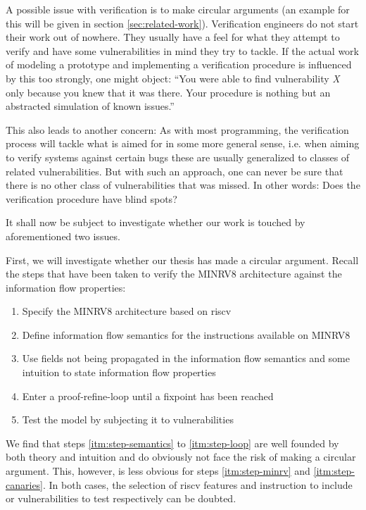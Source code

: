 A possible issue with verification is to make circular arguments (an example for this will be given in section \ref{sec:related-work}).
Verification engineers do not start their work out of nowhere.
They usually have a feel for what they attempt to verify and have some vulnerabilities in mind they try to tackle.
If the actual work of modeling a prototype and implementing a verification procedure is influenced by this too strongly, one might object:
\enquote{You were able to find vulnerability \textit{X} only because you knew that it was there. Your procedure is nothing but an abstracted simulation of known issues.}

This also leads to another concern:
As with most programming, the verification process will tackle what is aimed for in some more general sense, i.e. when aiming to verify systems against certain bugs these are usually generalized to classes of related vulnerabilities.
But with such an approach, one can never be sure that there is no other class of vulnerabilities that was missed.
In other words: Does the verification procedure have blind spots?

It shall now be subject to investigate whether our work is touched by aforementioned two issues.

First, we will investigate whether our thesis has made a circular argument.
Recall the steps that have been taken to verify the MINRV8 architecture against the information flow properties:
\begin{enumerate}
    \item \label{itm:step-minrv}
    Specify the MINRV8 architecture based on \gls{riscv}
    \item \label{itm:step-semantics}
    Define information flow semantics for the instructions available on MINRV8
    \item \label{itm:step-properties}
    Use fields not being propagated in the information flow semantics and some intuition to state information flow properties
    \item \label{itm:step-loop}
    Enter a proof-refine-loop until a fixpoint has been reached
    \item \label{itm:step-canaries}
    Test the model by subjecting it to vulnerabilities
\end{enumerate}

We find that steps \ref{itm:step-semantics} to \ref{itm:step-loop} are well founded by both theory and intuition and do obviously not face the risk of making a circular argument.
This, however, is less obvious for steps \ref{itm:step-minrv} and \ref{itm:step-canaries}.
In both cases, the selection of \gls{riscv} features and instruction to include or vulnerabilities to test respectively can be doubted.

